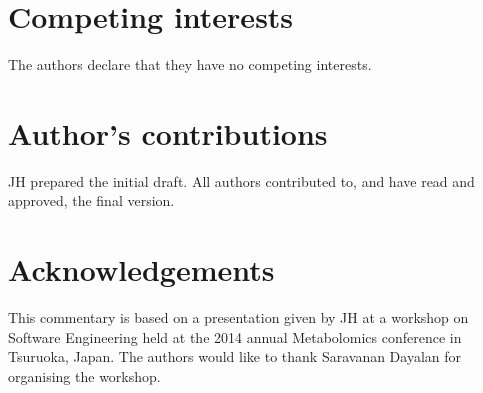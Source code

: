 \documentclass{bmcart}
\begin{document}
\begin{backmatter}

\section*{Competing interests}
  The authors declare that they have no competing interests.

\section*{Author's contributions}
    JH prepared the initial draft. All authors contributed to, and have read and approved, the final version. 

\section*{Acknowledgements}
  This commentary is based on a presentation given by JH at a workshop on Software Engineering held at the 2014 annual Metabolomics conference in Tsuruoka, Japan. The authors would like to thank Saravanan Dayalan for organising the workshop. 





\end{backmatter}
\end{document}
